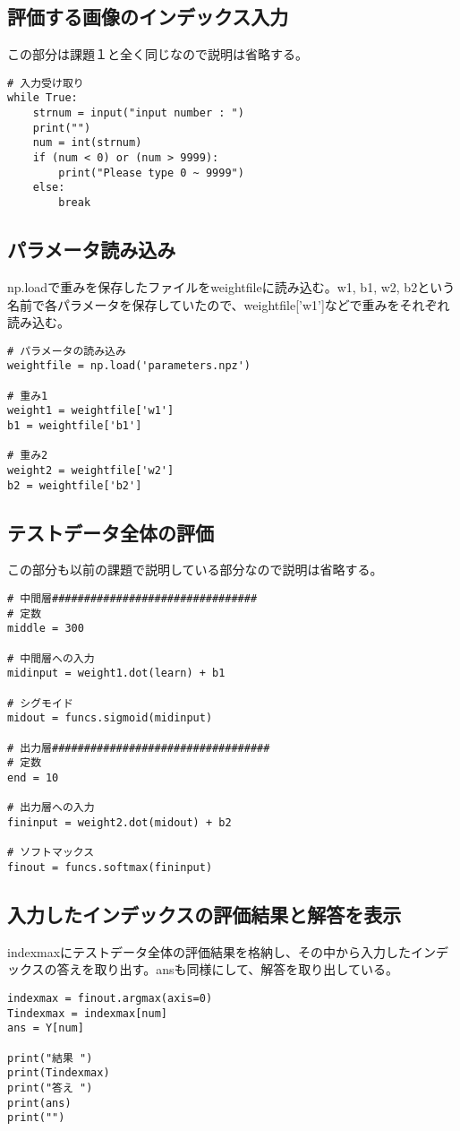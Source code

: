 \documentclass{ujarticle}
\begin{document}
\subsection{評価する画像のインデックス入力}
この部分は課題１と全く同じなので説明は省略する。
\begin{lstlisting}[basicstyle=\ttfamily\footnotesize, frame=single]
# 入力受け取り
while True:
    strnum = input("input number : ")
    print("")
    num = int(strnum)
    if (num < 0) or (num > 9999):
        print("Please type 0 ~ 9999")
    else:
        break
\end{lstlisting}

\subsection{パラメータ読み込み}
np.loadで重みを保存したファイルをweightfileに読み込む。w1, b1, w2, b2という名前で各パラメータを保存していたので、weightfile['w1']などで重みをそれぞれ読み込む。
\begin{lstlisting}[basicstyle=\ttfamily\footnotesize, frame=single]
# パラメータの読み込み
weightfile = np.load('parameters.npz')

# 重み1
weight1 = weightfile['w1']
b1 = weightfile['b1']

# 重み2
weight2 = weightfile['w2']
b2 = weightfile['b2']
\end{lstlisting}

\subsection{テストデータ全体の評価}
この部分も以前の課題で説明している部分なので説明は省略する。
\begin{lstlisting}[basicstyle=\ttfamily\footnotesize, frame=single]
# 中間層################################
# 定数
middle = 300

# 中間層への入力
midinput = weight1.dot(learn) + b1

# シグモイド
midout = funcs.sigmoid(midinput)

# 出力層##################################
# 定数
end = 10

# 出力層への入力
fininput = weight2.dot(midout) + b2

# ソフトマックス
finout = funcs.softmax(fininput)
\end{lstlisting}

\subsection{入力したインデックスの評価結果と解答を表示}
indexmaxにテストデータ全体の評価結果を格納し、その中から入力したインデックスの答えを取り出す。ansも同様にして、解答を取り出している。
\begin{lstlisting}[basicstyle=\ttfamily\footnotesize, frame=single]
indexmax = finout.argmax(axis=0)
Tindexmax = indexmax[num]
ans = Y[num]

print("結果 ")
print(Tindexmax)
print("答え ")
print(ans)
print("")
\end{lstlisting}
\end{document}
